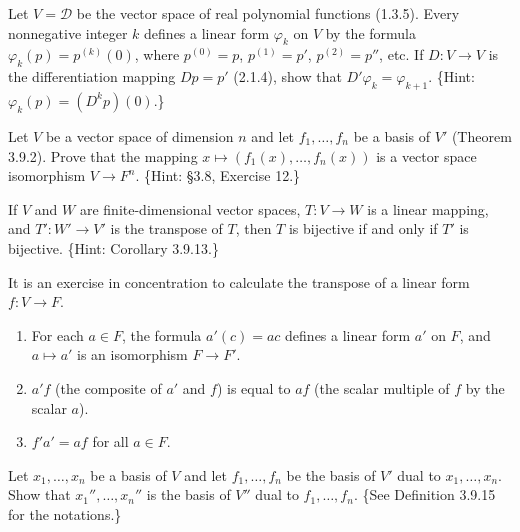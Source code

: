 \begin{tcolorbox}[title=Exercise 5, breakable]
    Let $V = \mathcal{D}$ be the vector space of real polynomial functions (1.3.5).
    Every nonnegative integer $k$ defines a linear form $\varphi_k$ on $V$ by the 
    formula $\varphi_k(p) = p^{(k)}(0)$, where $p^{(0)} = p$, $p^{(1)} = p'$, 
    $p^{(2)} = p''$, etc. If $D : V \to V$ is the differentiation mapping $Dp = p'$ 
    (2.1.4), show that $D'\varphi_k = \varphi_{k+1}$. 
    \{Hint: $\varphi_k(p) = (D^k p)(0)$.\}
\end{tcolorbox}

\begin{tcolorbox}[title=Exercise 6, breakable]
    Let $V$ be a vector space of dimension $n$ and let $f_1, \ldots, f_n$ be a basis of 
    $V'$ (Theorem 3.9.2). Prove that the mapping $x \mapsto (f_1(x), \ldots, f_n(x))$ is a 
    vector space isomorphism $V \to F^n$. \{Hint: \S 3.8, Exercise 12.\}
\end{tcolorbox}

\begin{tcolorbox}[title=Exercise 7, breakable]
    If $V$ and $W$ are finite-dimensional vector spaces, $T : V \to W$ is a linear 
    mapping, and $T' : W' \to V'$ is the transpose of $T$, then $T$ is bijective if 
    and only if $T'$ is bijective. \{Hint: Corollary 3.9.13.\}
\end{tcolorbox}

\begin{tcolorbox}[title=Exercise 8, breakable]
    It is an exercise in concentration to calculate the transpose of a linear 
    form $f : V \to F$.
    \begin{enumerate}
        \item[(i)] For each $a \in F$, the formula $a'(c) = ac$ defines a linear form $a'$ on 
        $F$, and $a \mapsto a'$ is an isomorphism $F \to F'$.
        \item[(ii)] $a'f$ (the composite of $a'$ and $f$) is equal to $af$ (the scalar multiple 
        of $f$ by the scalar $a$).
        \item[(iii)] $f'a' = af$ for all $a \in F$.
    \end{enumerate}
\end{tcolorbox}

\begin{tcolorbox}[title=Exercise 9, breakable]
    Let $x_1, \ldots, x_n$ be a basis of $V$ and let $f_1, \ldots, f_n$ be the basis of $V'$ 
    dual to $x_1, \ldots, x_n$. Show that $x_1'', \ldots, x_n''$ is the basis of $V''$ dual to 
    $f_1, \ldots, f_n$. \{See Definition 3.9.15 for the notations.\}
\end{tcolorbox}

